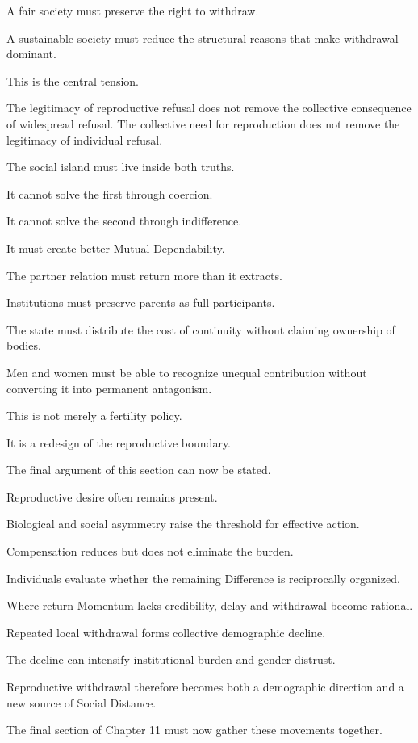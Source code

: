 A fair society must preserve the right to withdraw.

A sustainable society must reduce the structural reasons that make withdrawal dominant.

This is the central tension.

The legitimacy of reproductive refusal does not remove the collective consequence of widespread refusal. The collective need for reproduction does not remove the legitimacy of individual refusal.

The social island must live inside both truths.

It cannot solve the first through coercion.

It cannot solve the second through indifference.

It must create better Mutual Dependability.

The partner relation must return more than it extracts.

Institutions must preserve parents as full participants.

The state must distribute the cost of continuity without claiming ownership of bodies.

Men and women must be able to recognize unequal contribution without converting it into permanent antagonism.

This is not merely a fertility policy.

It is a redesign of the reproductive boundary.

The final argument of this section can now be stated.

Reproductive desire often remains present.

Biological and social asymmetry raise the threshold for effective action.

Compensation reduces but does not eliminate the burden.

Individuals evaluate whether the remaining Difference is reciprocally organized.

Where return Momentum lacks credibility, delay and withdrawal become rational.

Repeated local withdrawal forms collective demographic decline.

The decline can intensify institutional burden and gender distrust.

Reproductive withdrawal therefore becomes both a demographic direction and a new source of Social Distance.

The final section of Chapter 11 must now gather these movements together.

